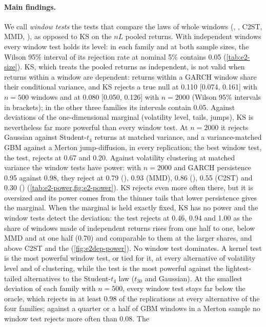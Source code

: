 \paragraph{Main findings.}
We call \emph{window tests} the tests that compare the laws of whole windows (\WC{}, \LRC{}, C2ST,
MMD, \SigMMD{}), as opposed to KS on the $nL$ pooled returns. With independent windows every
window test holds its level: in each family and at both sample sizes, the Wilson 95\% interval of
its rejection rate at nominal 5\% contains 0.05 (\cref{tab:e2-size}). KS, which treats the pooled
returns as independent, is not valid when returns within a window are dependent: returns within a
GARCH window share their conditional variance, and KS rejects a true null at 0.110 [0.074, 0.161]
with $n=500$ windows and at 0.080 [0.050, 0.126] with $n=2000$ (Wilson 95\% intervals in
brackets); in the other three families its intervals contain 0.05.
Against deviations of the one-dimensional marginal (volatility level, tails, jumps), KS is
nevertheless far more powerful than every window test. At $n=2000$ it rejects Gaussian against
Student-$t_4$ returns at matched variance, and a variance-matched GBM against a Merton
jump-diffusion, in every replication; the best window test, the \WC{} test, rejects at 0.67 and
0.20. Against volatility clustering at matched variance the window tests have power: with $n=2000$
and GARCH persistence 0.95 against 0.98, they reject at 0.79 (\WC{}), 0.93 (MMD), 0.86
(\SigMMD{}), 0.55 (C2ST) and 0.30 (\LRC{}) (\cref{tab:e2-power,fig:e2-power}). KS rejects even more
often there, but it is oversized and its power comes from the thinner tails that lower persistence
gives the marginal. When the marginal is held exactly fixed, KS has no power and the window tests
detect the deviation: the \WC{} test rejects at 0.46, 0.94 and 1.00 as the share of windows made
of independent returns rises from one half to one, below MMD and \SigMMD{} at one half (0.70)
and comparable to them at the larger shares, and above C2ST and the \LRC{}
(\cref{fig:e2dep-power}). No window test dominates. A kernel test is the most
powerful window test, or tied for it, at every alternative of volatility level and of
clustering, while the \WC{} test is the most powerful against the lightest-tailed alternatives to
the Student-$t_4$ law ($t_{30}$ and Gaussian). At the smallest deviation of each family with
$n=500$, every window test stays far below the oracle, which rejects in at least 0.98 of the
replications at every alternative of the four families; against a quarter
or a half of GBM windows in a Merton sample no window test rejects more often than 0.08. The
